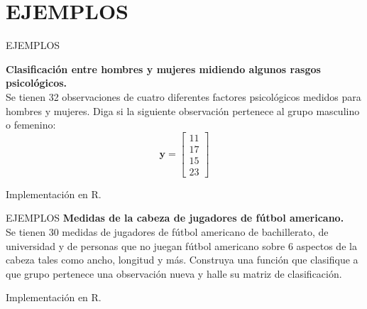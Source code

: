 \section{EJEMPLOS}
\begin{frame}{EJEMPLOS}

\textbf{Clasificación entre hombres y mujeres midiendo algunos rasgos psicológicos.} \\\vspace{0.5cm}
Se tienen 32 observaciones de cuatro diferentes factores psicológicos medidos para hombres y mujeres. Diga si la siguiente observación pertenece al grupo masculino o femenino:
    \begin{equation}
        \mathbf{y}=\begin{bmatrix}
            11\\
            17\\
            15\\
            23
        \end{bmatrix}
    \end{equation}

Implementación en R.
\end{frame}

\begin{frame}{EJEMPLOS}
\textbf{Medidas de la cabeza de jugadores de fútbol americano.} \\\vspace{0.5cm}
Se tienen 30 medidas de jugadores de fútbol americano de bachillerato, de universidad y de personas que no juegan fútbol americano sobre 6 aspectos de la cabeza tales como ancho, longitud y más. Construya una función que clasifique a que grupo pertenece una observación nueva y halle su matriz de clasificación.

Implementación en R.
\end{frame}